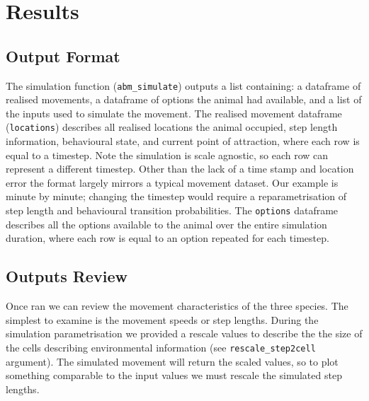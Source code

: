 \documentclass[10pt,a4paper]{article}
\begin{document}
\hypertarget{results}{%
\section{Results}\label{results}}

\hypertarget{output-format}{%
\subsection{Output Format}\label{output-format}}

The simulation function (\texttt{abm\_simulate}) outputs a list containing: a dataframe of realised movements, a dataframe of options the animal had available, and a list of the inputs used to simulate the movement.
The realised movement dataframe (\texttt{locations}) describes all realised locations the animal occupied, step length information, behavioural state, and current point of attraction, where each row is equal to a timestep.
Note the simulation is scale agnostic, so each row can represent a different timestep.
Other than the lack of a time stamp and location error the format largely mirrors a typical movement dataset.
Our example is minute by minute; changing the timestep would require a reparametrisation of step length and behavioural transition probabilities.
The \texttt{options} dataframe describes all the options available to the animal over the entire simulation duration, where each row is equal to an option repeated for each timestep.

\hypertarget{outputs-review}{%
\subsection{Outputs Review}\label{outputs-review}}

Once ran we can review the movement characteristics of the three species.
The simplest to examine is the movement speeds or step lengths.
During the simulation parametrisation we provided a rescale values to describe the the size of the cells describing environmental information (see \texttt{rescale\_step2cell} argument).
The simulated movement will return the scaled values, so to plot something comparable to the input values we must rescale the simulated step lengths.
\end{document}
